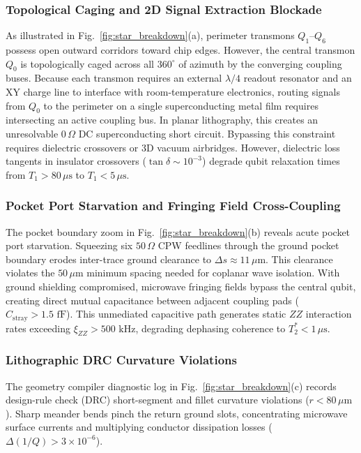\documentclass[10pt,journal,compsoc]{IEEEtran}
\begin{document}
\subsubsection{Topological Caging and 2D Signal Extraction Blockade}
As illustrated in Fig.~\ref{fig:star_breakdown}(a), perimeter transmons $Q_1$--$Q_6$ possess open outward corridors toward chip edges. However, the central transmon $Q_0$ is topologically caged across all $360^\circ$ of azimuth by the converging coupling buses. Because each transmon requires an external $\lambda/4$ readout resonator and an XY charge line to interface with room-temperature electronics, routing signals from $Q_0$ to the perimeter on a single superconducting metal film requires intersecting an active coupling bus. In planar lithography, this creates an unresolvable $0\,\Omega$ DC superconducting short circuit. Bypassing this constraint requires dielectric crossovers or 3D vacuum airbridges. However, dielectric loss tangents in insulator crossovers ($\tan\delta \sim 10^{-3}$) degrade qubit relaxation times from $T_1 > 80\,\mu\text{s}$ to $T_1 < 5\,\mu\text{s}$.

\subsubsection{Pocket Port Starvation and Fringing Field Cross-Coupling}
The pocket boundary zoom in Fig.~\ref{fig:star_breakdown}(b) reveals acute pocket port starvation. Squeezing six $50\,\Omega$ CPW feedlines through the ground pocket boundary erodes inter-trace ground clearance to $\Delta s \approx 11\,\mu\text{m}$. This clearance violates the $50\,\mu\text{m}$ minimum spacing needed for coplanar wave isolation. With ground shielding compromised, microwave fringing fields bypass the central qubit, creating direct mutual capacitance between adjacent coupling pads ($C_{\text{stray}} > 1.5\text{ fF}$). This unmediated capacitive path generates static $ZZ$ interaction rates exceeding $\xi_{ZZ} > 500\text{ kHz}$, degrading dephasing coherence to $T_2^* < 1\,\mu\text{s}$.

\subsubsection{Lithographic DRC Curvature Violations}
The geometry compiler diagnostic log in Fig.~\ref{fig:star_breakdown}(c) records design-rule check (DRC) short-segment and fillet curvature violations ($r < 80\,\mu\text{m}$). Sharp meander bends pinch the return ground slots, concentrating microwave surface currents and multiplying conductor dissipation losses ($\Delta(1/Q) > 3 \times 10^{-6}$).
\end{document}

